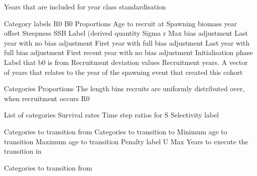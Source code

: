  {Years that are included for year class standardisation}
\par\textbf{}\par
{} {Category labels}
 {R0}
 {B0}
 {Proportions}
 {Age to recruit at}
 {Spawning biomass year offset}
 {Steepness}
 {SSB Label (derived quantity}
 {Sigma r}
 {Max bias adjustment}
 {Last year with no bias adjustment}
 {First year with full bias adjustment}
 {Last year with full bias adjustment}
 {First recent year with no bias adjustment}
 {Initialisation phase Label that b0 is from}
 {Recruitment deviation values}
 {Recruitment years. A vector of years that relates to the year of the spawning event that created this cohort}
\par\textbf{}\par
{} {Categories}
 {Proportions}
 {The length bins recruits are uniformly distributed over, when recruitment occurs}
 {R0}
\par\textbf{}\par
{} {List of categories}
 {Survival rates}
 {Time step ratios for S}
 {Selectivity label}
\par\textbf{}\par
{} {Categories to transition from}
 {Categories to transition to}
 {Minimum age to transition}
 {Maximum age to transition}
 {Penalty label}
 {U Max}
 {Years to execute the transition in}
 {}
 {}
 {}
 {}
 {}
 {}
\par\textbf{}\par
{} {Categories to transition from}
